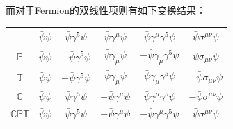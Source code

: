 而对于Fermion的双线性项则有如下变换结果：
\begin{center}
	\begin{tabular}{c  c c c c c}
    \hline
		&	$\bar{\psi}\psi$&	$\bar{\psi}\gamma^5\psi$&	$\bar{\psi}\gamma^\mu\psi$&	$\bar{\psi}\gamma^\mu\gamma^5\psi$&	$\bar{\psi}\sigma^{\mu\nu}\psi$\\
		\hline
		$\mathbb{P}$&	$\bar{\psi}\psi$&	$-\bar{\psi}\gamma^5\psi$&	$\bar{\psi}\gamma_\mu\psi$&	$-\bar{\psi}\gamma_\mu\gamma^5\psi$&	$\bar{\psi}\sigma_{\mu\nu}\psi$\\
		$\mathbb{T}$&	$\bar{\psi}\psi$&	$-\bar{\psi}\gamma^5\psi$&	$\bar{\psi}\gamma_\mu\psi$&	$\bar{\psi}\gamma_\mu\gamma^5\psi$&	$-\bar{\psi}\sigma_{\mu\nu}\psi$\\
		$\mathbb{C}$&	$\bar{\psi}\psi$&	$\bar{\psi}\gamma^5\psi$&	$-\bar{\psi}\gamma^\mu\psi$&	$\bar{\psi}\gamma^\mu\gamma^5\psi$&	$-\bar{\psi}\sigma^{\mu\nu}\psi$\\
		$\mathbb{CPT}$&	$\bar{\psi}\psi$&	$\bar{\psi}\gamma^5\psi$&	$-\bar{\psi}\gamma^\mu\psi$&	$-\bar{\psi}\gamma^\mu\gamma^5\psi$&	$\bar{\psi}\sigma^{\mu\nu}\psi$\\
        \hline
	\end{tabular}
\end{center}

